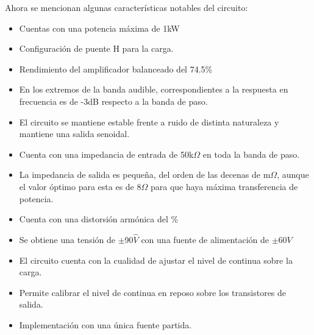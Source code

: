 Ahora se mencionan algunas características notables del circuito:
\begin{itemize}
\item Cuentas con una potencia máxima de 1kW
\item Configuración de puente H  para la carga.
\item Rendimiento del amplificador balanceado del 74.5$\%$
\item En los extremos de la banda audible, correspondientes a la respuesta en frecuencia es de -3dB respecto a la banda de paso.

\item El circuito se mantiene estable frente a ruido de distinta naturaleza y mantiene una salida senoidal.

\item Cuenta con una impedancia de entrada de 50k$\Omega$ en toda la banda de paso.
\item La impedancia de salida es pequeña, del orden de las decenas de m$\Omega$, aunque el valor óptimo para esta es de 8$\Omega$ para que haya máxima transferencia de potencia.


\item Cuenta con una distorsión armónica del $\%$
\item Se obtiene una tensión de $\pm$90$\hat{V}$ con una fuente de  alimentación de $\pm 60V$
\item El circuito cuenta con la cualidad de ajustar el nivel de continua sobre la carga.
\item Permite calibrar el nivel de continua en reposo sobre los transistores de salida.
\item Implementación con una única fuente partida.



\end{itemize}

